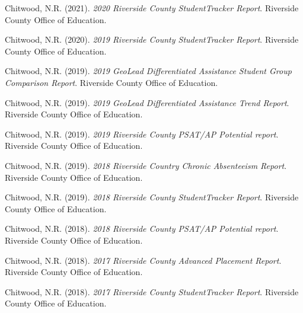 

    \begin{pubitems} %
      \item {Chitwood, N.R. (2021). \textit{2020 Riverside County StudentTracker Report}. Riverside County Office of Education.}
      \item {Chitwood, N.R. (2020). \textit{2019 Riverside County StudentTracker Report}. Riverside County Office of Education.}
      \item {Chitwood, N.R. (2019). \textit{2019 GeoLead Differentiated Assistance Student Group Comparison Report}. Riverside County Office of Education.}
      \item {Chitwood, N.R. (2019). \textit{2019 GeoLead Differentiated Assistance Trend Report}. Riverside County Office of Education.}
      \item {Chitwood, N.R. (2019). \textit{2019 Riverside County PSAT/AP Potential report}. Riverside County Office of Education.}
      \item {Chitwood, N.R. (2019). \textit{2018 Riverside Country Chronic Absenteeism Report}. Riverside County Office of Education.}
      \item {Chitwood, N.R. (2019). \textit{2018 Riverside County StudentTracker Report}. Riverside County Office of Education. }
      \item {Chitwood, N.R. (2018). \textit{2018 Riverside County PSAT/AP Potential report}. Riverside County Office of Education.}
      \item {Chitwood, N.R. (2018). \textit{2017 Riverside County Advanced Placement Report}. Riverside County Office of Education.}
      \item {Chitwood, N.R. (2018). \textit{2017 Riverside County StudentTracker Report}. Riverside County Office of Education. }
    \end{pubitems}

